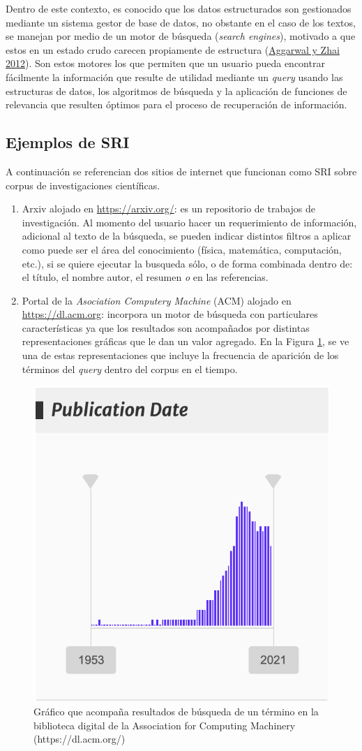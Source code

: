 \documentclass[
  12pt,
  openany]{book}
\begin{document}
Dentro de este contexto, es conocido que los datos estructurados son gestionados mediante un sistema gestor de base de datos, no obstante en el caso de los textos, se manejan por medio de un motor de búsqueda (\emph{search engines}), motivado a que estos en un estado crudo carecen propiamente de estructura (\protect\hyperlink{ref-miningt2012}{Aggarwal y Zhai 2012}). Son estos motores los que permiten que un usuario pueda encontrar fácilmente la información que resulte de utilidad mediante un \emph{query} usando las estructuras de datos, los algoritmos de búsqueda y la aplicación de funciones de relevancia que resulten óptimos para el proceso de recuperación de información.

\hypertarget{ejemplos-de-sri}{%
\subsection{Ejemplos de SRI}\label{ejemplos-de-sri}}

A continuación se referencian dos sitios de internet que funcionan como SRI sobre corpus de investigaciones científicas.

\begin{enumerate}
\def\labelenumi{\arabic{enumi}.}
\item
  Arxiv alojado en \url{https://arxiv.org/}: es un repositorio de trabajos de investigación. Al momento del usuario hacer un requerimiento de información, adicional al texto de la búsqueda, se pueden indicar distintos filtros a aplicar como puede ser el área del conocimiento (física, matemática, computación, etc.), si se quiere ejecutar la busqueda sólo, o de forma combinada dentro de: el título, el nombre autor, el resumen \emph{o} en las referencias.
\item
  Portal de la \emph{Asociation Computery Machine} (ACM) alojado en \url{https://dl.acm.org}: incorpora un motor de búsqueda con particulares características ya que los resultados son acompañados por distintas representaciones gráficas que le dan un valor agregado. En la Figura \ref{fig:busquedasacm}, se ve una de estas representaciones que incluye la frecuencia de aparición de los términos del \emph{query} dentro del corpus en el tiempo.
\end{enumerate}

\begin{figure}

{\centering \includegraphics[width=0.3\linewidth]{images/03-marco-teorico/busquedaacm} 

}

\caption{Gráfico que acompaña resultados de búsqueda de un término en la biblioteca digital de la Association for Computing Machinery (https://dl.acm.org/)}\label{fig:busquedasacm}
\end{figure}
\end{document}
